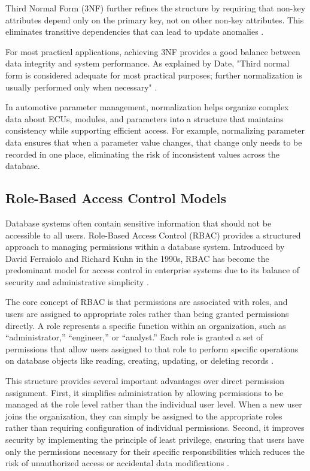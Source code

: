 Third Normal Form (3NF) further refines the structure by requiring that non-key attributes depend only on the primary key, not on other non-key attributes. This eliminates transitive dependencies that can lead to update anomalies \cite{elmasri2015fundamentals}.

For most practical applications, achieving 3NF provides a good balance between data integrity and system performance. As explained by Date, "Third normal form is considered adequate for most practical purposes; further normalization is usually performed only when necessary" \cite{date2011sql}.

In automotive parameter management, normalization helps organize complex data about ECUs, modules, and parameters into a structure that maintains consistency while supporting efficient access. For example, normalizing parameter data ensures that when a parameter value changes, that change only needs to be recorded in one place, eliminating the risk of inconsistent values across the database.

\subsection{Role-Based Access Control Models}
\label{subsec:role-based-access-control}

Database systems often contain sensitive information that should not be accessible to all users. Role-Based Access Control (RBAC) provides a structured approach to managing permissions within a database system. Introduced by David Ferraiolo and Richard Kuhn in the 1990s, RBAC has become the predominant model for access control in enterprise systems due to its balance of security and administrative simplicity \cite{sandhu1998role}.

The core concept of RBAC is that permissions are associated with roles, and users are assigned to appropriate roles rather than being granted permissions directly. A role represents a specific function within an organization, such as ``administrator,'' ``engineer,'' or ``analyst.'' Each role is granted a set of permissions that allow users assigned to that role to perform specific operations on database objects like reading, creating, updating, or deleting records \cite{ferraiolo2011policy}.

This structure provides several important advantages over direct permission assignment. First, it simplifies administration by allowing permissions to be managed at the role level rather than the individual user level. When a new user joins the organization, they can simply be assigned to the appropriate roles rather than requiring configuration of individual permissions. Second, it improves security by implementing the principle of least privilege, ensuring that users have only the permissions necessary for their specific responsibilities which reduces the risk of unauthorized access or accidental data modifications \cite{sandhu1998role}.

